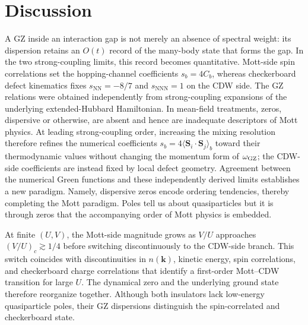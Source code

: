 \documentclass[aps,prl,reprint,superscriptaddress,nofootinbib,longbibliography]{revtex4-1}
\newcommand{\nk}{n(\mathbf{k})}
\begin{document}
\section{Discussion}
A GZ inside an interaction gap is not merely an absence of spectral weight: its dispersion retains an $O(t)$ record of the many-body state that forms the gap. In the two strong-coupling limits, this record becomes quantitative. Mott-side spin correlations set the hopping-channel coefficients $s_b=4C_b$, whereas checkerboard defect kinematics fixes $s_{\mathrm{NN}}=-8/7$ and $s_{\mathrm{NNN}}=1$ on the CDW side. The GZ relations were obtained independently from strong-coupling expansions of the underlying extended-Hubbard Hamiltonian.  In mean-field treatments, zeros, dispersive or otherwise, are absent and hence are inadequate descriptors of Mott physics.  At leading strong-coupling order, increasing the mixing resolution therefore refines the numerical coefficients $s_b=4\langle\mathbf S_i\!\cdot\!\mathbf S_j\rangle_b$ toward their thermodynamic values without changing the momentum form of $\omega_{\rm GZ}$; the CDW-side coefficients are instead fixed by local defect geometry. Agreement between the numerical Green functions and these independently derived limits establishes a new paradigm.  Namely, dispersive zeros encode ordering tendencies, thereby completing the Mott paradigm.  Poles tell us about quasiparticles but it is through zeros that the accompanying order of Mott physics is embedded.

At finite $(U,V)$, the Mott-side magnitude grows as $V/U$ approaches $(V/U)_c\gtrsim1/4$ before switching discontinuously to the CDW-side branch. This switch coincides with discontinuities in $\nk$, kinetic energy, spin correlations, and checkerboard charge correlations that identify a first-order Mott--CDW transition for large $U$. The dynamical zero and the underlying ground state therefore reorganize together. Although both insulators lack low-energy quasiparticle poles, their GZ dispersions distinguish the spin-correlated and checkerboard state.
\end{document}
